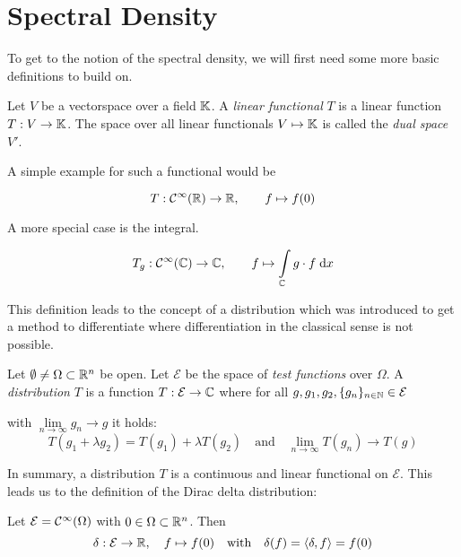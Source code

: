\section{Spectral Density}

To get to the notion of the spectral density,
we will first need some more basic definitions to build on.

\begin{definition}
    Let $V$ be a vectorspace over a field $\mathbb{K}$. A \emph{linear functional} $T$ is a linear function $T: V \to \mathbb{K}$.
    The space over all linear functionals $V \mapsto \mathbb{K}$ is called the \emph{dual space} $V'$.
\end{definition}

A simple example for such a functional would be

\begin{equation} \label{eq:functional_example_simple}
    T: \mathcal{C}^{\infty}(\mathbb{R}) \to \mathbb{R}, \qquad f \mapsto f(0)
\end{equation}

A more special case is the integral.

\begin{equation} \label{eq:functional_example_integral}
    T_g: \mathcal{C}^{\infty}(\mathbb{C}) \to \mathbb{C}, \qquad f \mapsto \int\limits_{\mathbb{C}} g \cdot f \;\mathrm{d}x
\end{equation}

This definition leads to the concept of a distribution
which was introduced to get a method to differentiate
where differentiation in the classical sense is not possible.

\begin{definition}[distribution]
    Let $\emptyset \neq \Omega \subset \mathbb{R}^n$ be open.
    Let $\mathcal{E}$ be the space of \emph{test functions} over $\Omega$.
    A \emph{distribution} $T$ is a function $T: \mathcal{E} \to \mathbb{C}$ where for all
    $g, g_1, g_2, \{g_n\}_{n \in \mathbb{N}} \in \mathcal{E}$

    with $\lim\limits_{n \to \infty} g_n \to g$ it holds:
    $$T(g_1 + \lambda g_2) = T(g_1) + \lambda T(g_2) \quad \text{and}\quad \lim\limits_{n \to \infty} T(g_n) \to T(g)$$
\end{definition}

In summary, a distribution $T$ is a continuous and linear functional on $\mathcal{E}$.
This leads us to the definition of the Dirac delta distribution:

\begin{definition}
    Let $\mathcal{E} = \mathcal{C}^{\infty}(\Omega)$ with $0 \in \Omega \subset \mathbb{R}^n$.
    Then
    $$\delta: \mathcal{E} \to \mathbb{R}, \quad f \mapsto f(0) \quad \text{with} \quad \delta(f) = \langle \delta, f \rangle = f(0)$$
\end{definition}

